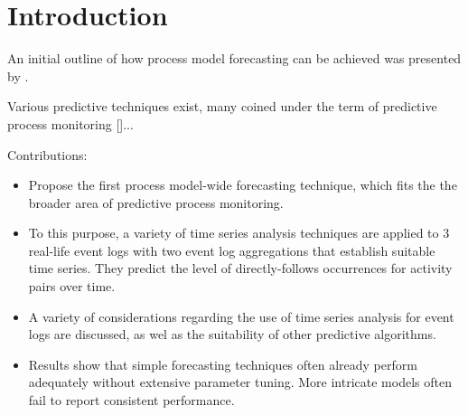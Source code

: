 \section{Introduction}\label{sec:introduction}

An initial outline of how process model forecasting can be achieved was presented by \cite{DBLP:conf/bpm/PollPRRR18}.

Various predictive techniques exist, many coined under the term of predictive process monitoring []...


Contributions:
\begin{itemize}
	\item Propose the first process model-wide forecasting technique, which fits the the broader area of predictive process monitoring.
	\item To this purpose, a variety of time series analysis techniques are applied to 3 real-life event logs with two event log aggregations that establish suitable time series. They predict the level of directly-follows occurrences for activity pairs over time.
	\item A variety of considerations regarding the use of time series analysis for event logs are discussed, as wel as the suitability of other predictive algorithms.
	\item Results show that simple forecasting techniques often already perform adequately without extensive parameter tuning. More intricate models often fail to report consistent performance.
\end{itemize}